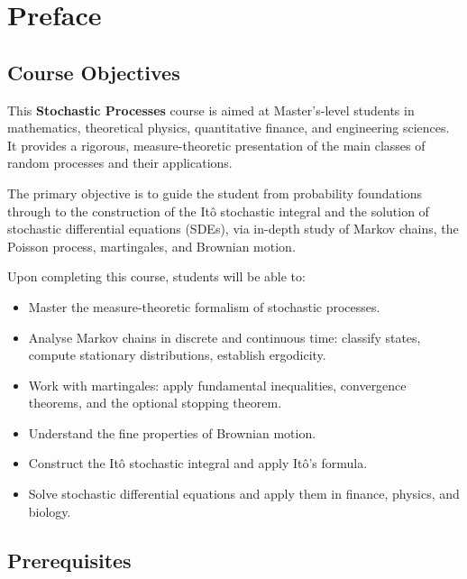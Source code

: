 \chapter*{Preface}

\section*{Course Objectives}

This \textbf{Stochastic Processes} course is aimed at Master's-level students in
mathematics, theoretical physics, quantitative finance, and engineering sciences.
It provides a rigorous, measure-theoretic presentation of the main classes of
random processes and their applications.

\medskip

The primary objective is to guide the student from probability foundations through
to the construction of the It\^o stochastic integral and the solution of stochastic
differential equations (SDEs), via in-depth study of Markov chains, the Poisson
process, martingales, and Brownian motion.

\medskip

Upon completing this course, students will be able to:
\begin{itemize}
  \item Master the measure-theoretic formalism of stochastic processes.
  \item Analyse Markov chains in discrete and continuous time: classify states,
    compute stationary distributions, establish ergodicity.
  \item Work with martingales: apply fundamental inequalities, convergence
    theorems, and the optional stopping theorem.
  \item Understand the fine properties of Brownian motion.
  \item Construct the It\^o stochastic integral and apply It\^o's formula.
  \item Solve stochastic differential equations and apply them in finance,
    physics, and biology.
\end{itemize}

\section*{Prerequisites}

